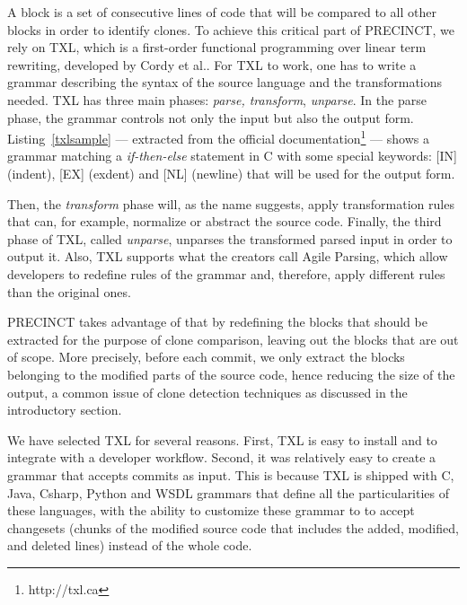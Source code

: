 \documentclass[conference]{IEEEtran}
\begin{document}
A block is a set of consecutive lines of code that will be compared to all other blocks in order to identify clones.
To achieve this critical part of PRECINCT, we rely on TXL\cite{Cordy2006a}, which is a first-order functional programming over linear term rewriting, developed by Cordy et al.\cite{Cordy2006a}.
For TXL to work, one has to write a grammar describing the syntax of the source  language and the transformations needed. TXL has three main phases: \textit{parse, transform}, \textit{unparse}.
In the parse phase, the grammar controls not only the input but also the output form.
Listing~\ref{txlsample} --- extracted from the official documentation\footnote{http://txl.ca} --- shows a grammar matching a \textit{if-then-else} statement in C with some special keywords: [IN] (indent), [EX] (exdent) and [NL] (newline) that will be used for the output form.

\noindent\begin{minipage}{0.90\linewidth}

  

\end{minipage}

Then, the \textit{transform} phase will, as the name suggests, apply transformation rules that can, for example, normalize or abstract the source code. Finally, the third phase of TXL,  called \textit{unparse}, unparses the transformed parsed input in order to output it.
Also, TXL supports what the creators call Agile Parsing\cite{Dean}, which allow developers to redefine rules of the grammar and, therefore, apply different rules than the original ones.


PRECINCT takes advantage of that by redefining the blocks that should be extracted for the purpose of clone comparison, leaving out the  blocks that are out of scope.
More precisely, before each commit, we only extract the blocks belonging to the modified parts of the source code, hence reducing the size of the output, a common issue of clone detection techniques as discussed in the introductory section.

We have selected TXL for several reasons. First, TXL is easy to install and to integrate with a developer workflow.
 Second, it was relatively easy to create a grammar that accepts commits as input.
 This is because TXL is shipped with C, Java, Csharp, Python and WSDL grammars that define all the particularities of these languages, with the ability to customize these grammar to to accept changesets (chunks of the modified source code that includes the added, modified, and deleted lines) instead of the whole code.
\end{document}
